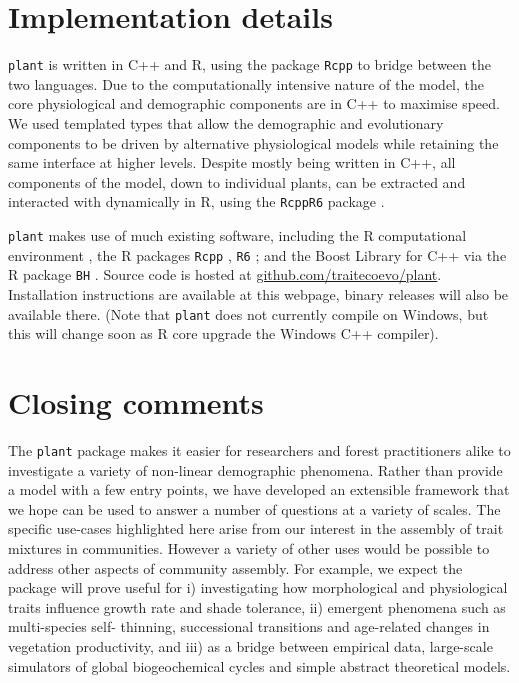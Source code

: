 \documentclass[a4paper,11pt]{article}
\newcommand{\plant}{\texttt{plant}}
\begin{document}
\section{Implementation details}

{\plant} is written in C++ and R, using the package \texttt{Rcpp}
\citep{Eddelbuettel-2011, Eddelbuettel-2013} to bridge between the two
languages. Due to the computationally intensive nature of the model,
the core physiological and demographic components are in C++ to
maximise speed. We used templated types that allow the demographic and
evolutionary components to be driven by alternative physiological
models while retaining the same interface at higher levels. Despite
mostly being written in C++, all components of the model, down to
individual plants, can be extracted and interacted with dynamically in
R, using the \texttt{RcppR6} package \citep{RcppR6}.

{\plant} makes use of much existing software, including the R
computational environment \citep{R-2015}, the R packages \texttt{Rcpp}
\citep{Eddelbuettel-2011, Eddelbuettel-2013}, \texttt{R6}
\citep{Chang-2014}; and the Boost Library for C++
\citep{Schaling-2014} via the R package \texttt{BH}
\citep{Eddelbuettel-2015}. Source code is hosted at
\href{https://github.com/traitecoevo/plant}{github.com/traitecoevo/plant}.
Installation instructions are available at this webpage, binary
releases will also be available there.  (Note that {\plant} does not
currently compile on Windows, but this will change soon as R core
upgrade the Windows C++ compiler).

\section{Closing comments}

The {\plant} package makes it easier for researchers and forest
practitioners alike to investigate a variety of non-linear demographic
phenomena.  Rather than provide a model with a few entry points, we
have developed an extensible framework that we hope can be used to
answer a number of questions at a variety of scales. The specific
use-cases highlighted here arise from our interest in the assembly of
trait mixtures in communities. However a variety of other uses would
be possible to address other aspects of community assembly. For
example, we expect the package will prove useful for i) investigating
how morphological and physiological traits influence growth rate and
shade tolerance, ii) emergent phenomena such as multi-species self-
thinning, successional transitions and age-related changes in
vegetation productivity, and iii) as a bridge between empirical data,
large-scale simulators of global biogeochemical cycles and simple
abstract theoretical models.
\end{document}
